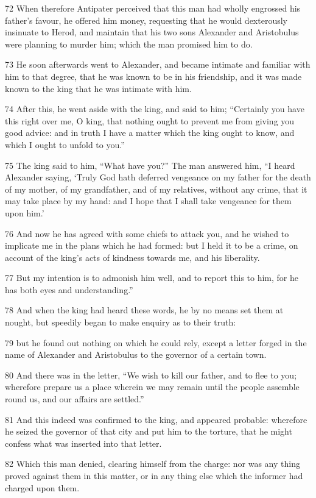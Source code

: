 72 When therefore Antipater perceived that this man had wholly engrossed his father’s favour, he offered him money, requesting that he would dexterously insinuate to Herod, and maintain that his two sons Alexander and Aristobulus were planning to murder him; which the man promised him to do. 

73 He soon afterwards went to Alexander, and became intimate and familiar with him to that degree, that he was known to be in his friendship, and it was made known to the king that he was intimate with him. 

74 After this, he went aside with the king, and said to him; “Certainly you have this right over me, O king, that nothing ought to prevent me from giving you good advice: and in truth I have a matter which the king ought to know, and which I ought to unfold to you.” 

75 The king said to him, “What have you?” The man answered him, “I heard Alexander saying, ‘Truly God hath deferred vengeance on my father for the death of my mother, of my grandfather, and of my relatives, without any crime, that it may take place by my hand: and I hope that I shall take vengeance for them upon him.’ 

76 And now he has agreed with some chiefs to attack you, and he wished to implicate me in the plans which he had formed: but I held it to be a crime, on account of the king’s acts of kindness towards me, and his liberality. 

77 But my intention is to admonish him well, and to report this to him, for he has both eyes and understanding.” 

78 And when the king had heard these words, he by no means set them at nought, but speedily began to make enquiry as to their truth: 

79 but he found out nothing on which he could rely, except a letter forged in the name of Alexander and Aristobulus to the governor of a certain town. 

80 And there was in the letter, “We wish to kill our father, and to flee to you; wherefore prepare us a place wherein we may remain until the people  assemble round us, and our affairs are settled.” 

81 And this indeed was confirmed to the king, and appeared probable: wherefore he seized the governor of that city and put him to the torture, that he might confess what was inserted into that letter. 

82 Which this man denied, clearing himself from the charge: nor was any thing proved against them in this matter, or in any thing else which the informer had charged upon them. 

